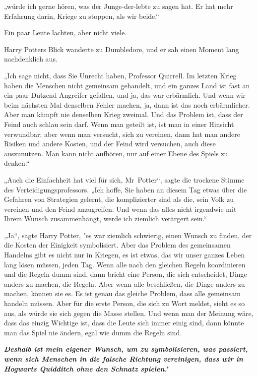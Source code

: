 {„würde ich gerne hören, was der Junge-der-lebte zu sagen hat. Er hat mehr Erfahrung darin, Kriege zu stoppen, als wir beide.“

Ein paar Leute lachten, aber nicht viele.

Harry Potters Blick wanderte zu Dumbledore, und er sah einen Moment lang nachdenklich aus.

„Ich sage nicht, dass Sie Unrecht haben, Professor Quirrell. Im letzten Krieg haben die Menschen nicht gemeinsam gehandelt, und ein ganzes Land ist fast an ein paar Dutzend Angreifer gefallen, und ja, das war erbärmlich. Und wenn wir beim nächsten Mal denselben Fehler machen, ja, dann ist das noch erbärmlicher. Aber man kämpft nie denselben Krieg zweimal. Und das Problem ist, dass der Feind auch schlau sein darf. Wenn man geteilt ist, ist man in einer Hinsicht verwundbar; aber wenn man versucht, sich zu vereinen, dann hat man andere Risiken und andere Kosten, und der Feind wird versuchen, auch diese auszunutzen. Man kann nicht aufhören, nur auf einer Ebene des Spiels zu denken.“

„Auch die Einfachheit hat viel für sich, Mr~Potter“, sagte die trockene Stimme des Verteidigungsprofessors. „Ich hoffe, Sie haben an diesem Tag etwas über die Gefahren von Strategien gelernt, die komplizierter sind als die, sein Volk zu vereinen und den Feind anzugreifen. Und wenn das alles nicht irgendwie mit Ihrem Wunsch zusammenhängt, werde ich ziemlich verärgert sein.“

„Ja“, sagte Harry Potter, "es war ziemlich schwierig, einen Wunsch zu finden, der die Kosten der Einigkeit symbolisiert. Aber das Problem des gemeinsamen Handelns gibt es nicht nur in Kriegen, es ist etwas, das wir unser ganzes Leben lang lösen müssen, jeden Tag. Wenn alle nach den gleichen Regeln koordinieren und die Regeln dumm sind, dann bricht eine Person, die sich entscheidet, Dinge anders zu machen, die Regeln. Aber wenn alle beschließen, die Dinge anders zu machen, können sie es. Es ist genau das gleiche Problem, dass alle gemeinsam handeln müssen. Aber für die erste Person, die sich zu Wort meldet, sieht es so aus, als würde sie sich gegen die Masse stellen. Und wenn man der Meinung wäre, dass das einzig Wichtige ist, dass die Leute sich immer einig sind, dann könnte man das Spiel nie ändern, egal wie dumm die Regeln sind.

\textbf{\emph{Deshalb ist mein eigener Wunsch, um zu symbolisieren, was passiert, wenn sich Menschen in die falsche Richtung vereinigen, dass wir in Hogwarts Quidditch ohne den Schnatz spielen}}."

}
